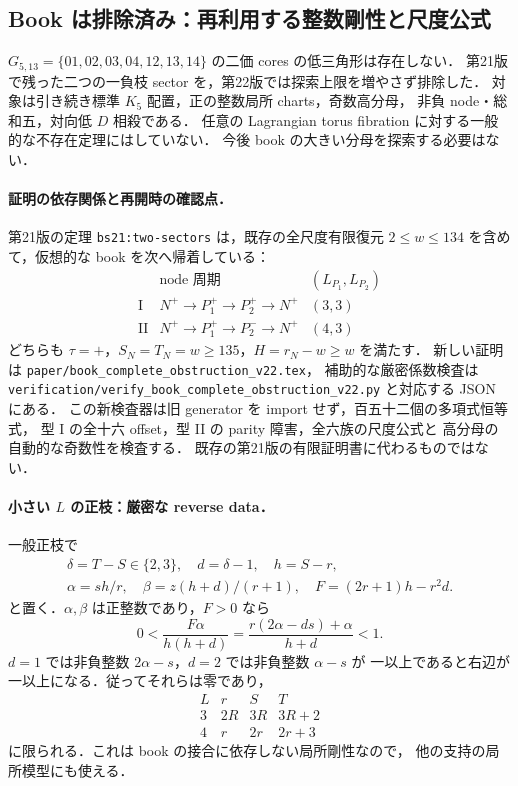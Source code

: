\subsection{Book は排除済み：再利用する整数剛性と尺度公式}
\label{nb22:section}

$G_{5,13}=\{01,02,03,04,12,13,14\}$ の二価 cores の低三角形は存在しない．
第21版で残った二つの一負枝 sector を，第22版では探索上限を増やさず排除した．
対象は引き続き標準 $K_5$ 配置，正の整数局所 charts，奇数高分母，
非負 node・総和五，対向低 $D$ 相殺である．
任意の Lagrangian torus fibration に対する一般的な不存在定理にはしていない．
今後 book の大きい分母を探索する必要はない．

\paragraph{証明の依存関係と再開時の確認点．}
第21版の定理 \texttt{bs21:two-sectors} は，既存の全尺度有限復元
$2\le w\le134$ を含めて，仮想的な book を次へ帰着している：
\[
 \begin{array}{c|c|c}
 &\text{node 周期}&(L_{P_1},L_{P_2})\\\hline
 \mathrm I&N^+\to P_1^+\to P_2^+\to N^+&(3,3)\\
 \mathrm {II}&N^+\to P_1^+\to P_2^-\to N^+&(4,3)
 \end{array}
\]
どちらも $\tau=+$，$S_N=T_N=w\ge135$，$H=r_N-w\ge w$ を満たす．
新しい証明は \nolinkurl{paper/book_complete_obstruction_v22.tex}，
補助的な厳密係数検査は
\nolinkurl{verification/verify_book_complete_obstruction_v22.py} と対応する JSON にある．
この新検査器は旧 generator を import せず，百五十二個の多項式恒等式，
型 I の全十六 offset，型 II の parity 障害，全六族の尺度公式と
高分母の自動的な奇数性を検査する．
既存の第21版の有限証明書に代わるものではない．

\paragraph{小さい $L$ の正枝：厳密な reverse data．}
一般正枝で
\[
 \begin{gathered}
 \delta=T-S\in\{2,3\},\quad d=\delta-1,\quad h=S-r,\\
 \alpha=sh/r,\quad\beta=z(h+d)/(r+1),\quad F=(2r+1)h-r^2d.
 \end{gathered}
\]
と置く．$\alpha,\beta$ は正整数であり，$F>0$ なら
\[
 0<\frac{F\alpha}{h(h+d)}
 =\frac{r(2\alpha-ds)+\alpha}{h+d}<1.
\]
$d=1$ では非負整数 $2\alpha-s$，$d=2$ では非負整数 $\alpha-s$ が
一以上であると右辺が一以上になる．従ってそれらは零であり，
\[
 \begin{array}{c|ccc}
 L&r&S&T\\\hline
 3&2R&3R&3R+2\\
 4&r&2r&2r+3
 \end{array}
\]
に限られる．これは book の接合に依存しない局所剛性なので，
他の支持の局所模型にも使える．

